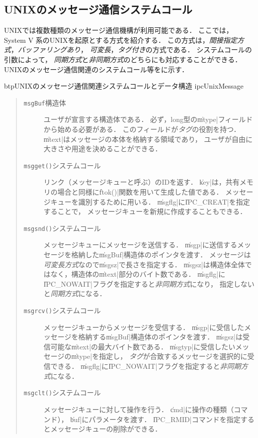 \subsection{UNIXのメッセージ通信システムコール}
UNIXでは複数種類のメッセージ通信機構が利用可能である．
ここでは，System V 系のUNIXを起原とする方式を紹介する．
この方式は，\emph{間接指定方式}，\emph{バッファリングあり}，
\emph{可変長}，\emph{タグ付き}の方式である．
システムコールの引数によって，
\emph{同期方式}と\emph{非同期方式}のどちらにも対応することができる．
UNIXのメッセージ通信関連のシステムコール等をに示す．

\begin{myfig}{btp}{UNIXのメッセージ通信関連システムコールとデータ構造}
  {ipcUnixMessage}
  
\end{myfig}

\begin{quote}
  \begin{description}
  \item [\texttt{msgBuf}構造体]
    ユーザが宣言する構造体である．
    必ず，long型の\|mtype|フィールドから始める必要がある．
    このフィールドが\emph{タグ}の役割を持つ．
    \|mtext|はメッセージの本体を格納する領域であり，
    ユーザが自由に大きさや用途を決めることができる．

  \item [\texttt{msgget()}システムコール]
    リンク（メッセージキューと呼ぶ）のIDを返す．
    \|key|は，共有メモリの場合と同様に\|ftok()|関数を用いて生成した値である．
    メッセージキューを識別するために用いる．
    \|msgflg|に\|IPC_CREAT|を指定することで，
    メッセージキューを新規に作成することもできる．

  \item [\texttt{msgsnd()}システムコール]
    メッセージキューにメッセージを送信する．
    \|msgp|に送信するメッセージを格納した\|msgBuf|構造体のポインタを渡す．
    メッセージは\emph{可変長方式}なので\|msgsz|で長さを指定する．
    \|msgsz|は構造体全体ではなく，構造体の\|mtext|部分のバイト数である．
    \|msgflg|に\|IPC_NOWAIT|フラグを指定すると\emph{非同期方式}になり，
    指定しないと\emph{同期方式}になる．

  \item [\texttt{msgrcv()}システムコール]
    メッセージキューからメッセージを受信する．
    \|msgp|に受信したメッセージを格納する\|msgBuf|構造体のポインタを渡す．
    \|msgsz|は受信可能な\|mtext|の最大バイト数である．
    \|msgtyp|に受信したいメッセージの\|mtype|を指定し，
    \emph{タグ}が合致するメッセージを選択的に受信できる．
    \|msgflg|に\|IPC_NOWAIT|フラグを指定すると\emph{非同期方式}になる．

  \item [\texttt{msgclt()}システムコール]
    メッセージキューに対して操作を行う．
    \|cmd|に操作の種類（コマンド），
    \|buf|にパラメータを渡す．
    \|IPC_RMID|コマンドを指定するとメッセージキューの削除ができる．
  \end{description}
\end{quote}

